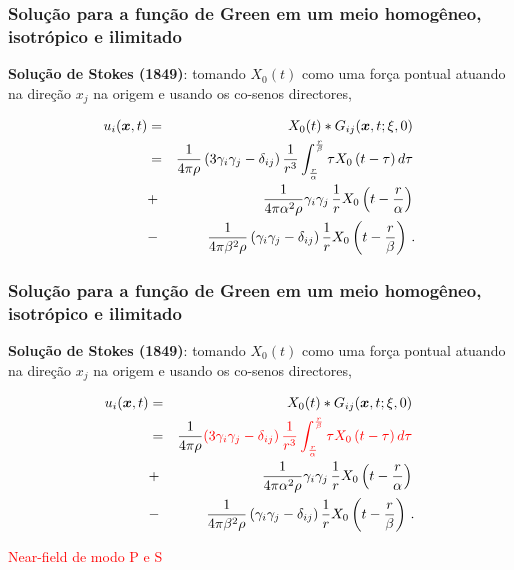 \documentclass{beamer}
\newcommand{\xvec}{\vc{x}}
\newcommand{\xivec}{\boldmath \xi}
\begin{document}
\begin{frame}
	\frametitle{\textbf{Solu\c{c}\~ao para a fun\c{c}\~ao de Green em um meio homog\^eneo, isotr\'opico e ilimitado}}
	
	\begin{flushleft}
		\textbf{Solu\c{c}\~ao de Stokes (1849)}: tomando $X_{0}(t)$ como uma for\c{c}a pontual atuando na dire\c{c}\~ao $x_j$ na origem e usando os co-senos 
		directores,
	\end{flushleft}
	\begin{eqnarray*}
		\label{ten1}
		u_i(\xvec,t) &=& X_{0}(t) * G_{ij}(\xvec,t;\xivec,0)\, \\
		&=&\frac{1}{4\pi\rho} \left(3\gamma_i\gamma_j -\delta_{ij} \right) \frac{1}{r^3}  \int_{ \frac{r }{\alpha}}^{ \frac{r}{\beta}} \tau X_{0}\left( t -\tau \right)  d\tau\, \\      
		&+&\frac{1}{4\pi\alpha^2\rho} \gamma_i\gamma_j \,\frac{1}{r}  X_{0}\left(t - \frac{r}{\alpha} \right)\, \\
		&-&\frac{1}{4\pi\beta^2\rho} \left(\gamma_i\gamma_j -\delta_{ij} \right)  \frac{1}{r}  X_{0}\left(t - \frac{r}{\beta} \right)\, .
	\end{eqnarray*}
	\begin{flushleft}
	\end{flushleft}
\end{frame}%



\begin{frame}
	\frametitle{\textbf{Solu\c{c}\~ao para a fun\c{c}\~ao de Green em um meio homog\^eneo, isotr\'opico e ilimitado}}
	
	\begin{flushleft}
		\textbf{Solu\c{c}\~ao de Stokes (1849)}: tomando $X_{0}(t)$ como uma for\c{c}a pontual atuando na dire\c{c}\~ao $x_j$ na origem e usando os co-senos 
		directores,
	\end{flushleft}
	\begin{eqnarray*}
		\label{ten1}
		u_i(\xvec,t) &=& X_{0}(t) * G_{ij}(\xvec,t;\xivec,0)\, \\
		&=&\frac{1}{4\pi\rho} \textcolor{red}{\left(3\gamma_i\gamma_j -\delta_{ij} \right) \frac{1}{r^3}  \int_{ \frac{r }{\alpha}}^{ \frac{r}{\beta}} \tau X_{0}\left( t -\tau \right)  d\tau }\, \\      
		&+&\frac{1}{4\pi\alpha^2\rho} \gamma_i\gamma_j \,\frac{1}{r}  X_{0}\left(t - \frac{r}{\alpha} \right)\, \\
		&-&\frac{1}{4\pi\beta^2\rho} \left(\gamma_i\gamma_j -\delta_{ij} \right)  \frac{1}{r}  X_{0}\left(t - \frac{r}{\beta} \right)\, .
	\end{eqnarray*}
	\begin{flushleft}
		\textcolor{red}{Near-field de modo P e S}
	\end{flushleft}
\end{frame}%
\end{document}
